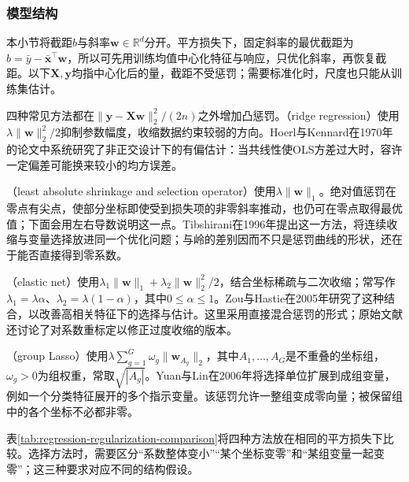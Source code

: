 \subsubsection{模型结构}
\label{sec:regression-penalties}

本小节将截距$b$与斜率$\bm{w}\in\mathbb{R}^d$分开。平方损失下，固定斜率的最优截距为$b=\bar y-\bar{\bm{x}}^{\top}\bm{w}$，所以可先用训练均值中心化特征与响应，只优化斜率，再恢复截距。以下$\bm{X},\bm{y}$均指中心化后的量，截距不受惩罚；需要标准化时，尺度也只能从训练集估计。

四种常见方法都在$\lVert\bm{y}-\bm{X}\bm{w}\rVert_2^2/(2n)$之外增加凸惩罚。（ridge regression）使用$\lambda\lVert\bm{w}\rVert_2^2/2$抑制参数幅度，收缩数据约束较弱的方向。Hoerl与Kennard在1970年的论文中系统研究了非正交设计下的有偏估计：当共线性使OLS方差过大时，容许一定偏差可能换来较小的均方误差。

（least absolute shrinkage and selection operator）使用$\lambda\lVert\bm{w}\rVert_1$。绝对值惩罚在零点有尖点，使部分坐标即使受到损失项的非零斜率推动，也仍可在零点取得最优值；下面会用左右导数说明这一点。Tibshirani在1996年提出这一方法，将连续收缩与变量选择放进同一个优化问题；与岭的差别因而不只是惩罚曲线的形状，还在于能否直接得到零系数。

（elastic net）使用$\lambda_1\lVert\bm{w}\rVert_1+\lambda_2\lVert\bm{w}\rVert_2^2/2$，结合坐标稀疏与二次收缩；常写作$\lambda_1=\lambda\alpha$、$\lambda_2=\lambda(1-\alpha)$，其中$0\leq\alpha\leq1$。Zou与Hastie在2005年研究了这种结合，以改善高相关特征下的选择与估计。这里采用直接混合惩罚的形式；原始文献还讨论了对系数重标定以修正过度收缩的版本。

（group Lasso）使用$\lambda\sum_{g=1}^{G}\omega_g\lVert\bm{w}_{A_g}\rVert_2$，其中$A_1,\ldots,A_G$是不重叠的坐标组，$\omega_g>0$为组权重，常取$\sqrt{|A_g|}$。Yuan与Lin在2006年将选择单位扩展到成组变量，例如一个分类特征展开的多个指示变量。该惩罚允许一整组变成零向量；被保留组中的各个坐标不必都非零。

表\ref{tab:regression-regularization-comparison}将四种方法放在相同的平方损失下比较。选择方法时，需要区分“系数整体变小”“某个坐标变零”和“某组变量一起变零”；这三种要求对应不同的结构假设。

